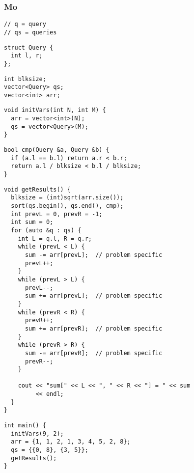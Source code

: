 \documentclass[twoside]{article}
\begin{document}
\begin{multicols*}{2}
\subsubsection*{Mo}
\begin{verbatim}
// q = query
// qs = queries
\end{verbatim}
\vspace{-12pt}
\begin{verbatim}
struct Query {
  int l, r;
};
\end{verbatim}
\vspace{-12pt}
\begin{verbatim}
int blksize;
vector<Query> qs;
vector<int> arr;
\end{verbatim}
\vspace{-12pt}
\begin{verbatim}
void initVars(int N, int M) {
  arr = vector<int>(N);
  qs = vector<Query>(M);
}
\end{verbatim}
\vspace{-12pt}
\begin{verbatim}
bool cmp(Query &a, Query &b) {
  if (a.l == b.l) return a.r < b.r;
  return a.l / blksize < b.l / blksize;
}
\end{verbatim}
\vspace{-12pt}
\begin{verbatim}
void getResults() {
  blksize = (int)sqrt(arr.size());
  sort(qs.begin(), qs.end(), cmp);
  int prevL = 0, prevR = -1;
  int sum = 0;
  for (auto &q : qs) {
    int L = q.l, R = q.r;
    while (prevL < L) {
      sum -= arr[prevL];  // problem specific
      prevL++;
    }
    while (prevL > L) {
      prevL--;
      sum += arr[prevL];  // problem specific
    }
    while (prevR < R) {
      prevR++;
      sum += arr[prevR];  // problem specific
    }
    while (prevR > R) {
      sum -= arr[prevR];  // problem specific
      prevR--;
    }

    cout << "sum[" << L << ", " << R << "] = " << sum
         << endl;
  }
}
\end{verbatim}
\vspace{-12pt}
\begin{verbatim}
int main() {
  initVars(9, 2);
  arr = {1, 1, 2, 1, 3, 4, 5, 2, 8};
  qs = {{0, 8}, {3, 5}};
  getResults();
}
\end{verbatim}


\end{multicols*}
\end{document}
